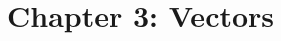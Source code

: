 \documentclass{article}
\begin{document}
\begin{subequations}
    \end{subequations}

\newpage

\section{Chapter 3: Vectors}

    
\end{document}
